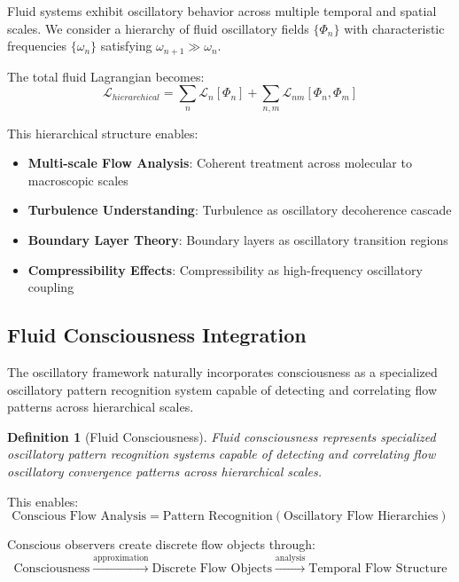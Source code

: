 \documentclass[12pt,a4paper]{article}
\newtheorem{definition}{Definition}
\begin{document}
Fluid systems exhibit oscillatory behavior across multiple temporal and spatial scales. We consider a hierarchy of fluid oscillatory fields $\{\Phi_n\}$ with characteristic frequencies $\{\omega_n\}$ satisfying $\omega_{n+1} \gg \omega_n$.

The total fluid Lagrangian becomes:
\begin{equation}
\mathcal{L}_{hierarchical} = \sum_n \mathcal{L}_n[\Phi_n] + \sum_{n,m} \mathcal{L}_{nm}[\Phi_n, \Phi_m]
\end{equation}

This hierarchical structure enables:
\begin{itemize}
\item \textbf{Multi-scale Flow Analysis}: Coherent treatment across molecular to macroscopic scales
\item \textbf{Turbulence Understanding}: Turbulence as oscillatory decoherence cascade
\item \textbf{Boundary Layer Theory}: Boundary layers as oscillatory transition regions
\item \textbf{Compressibility Effects}: Compressibility as high-frequency oscillatory coupling
\end{itemize}

\subsection{Fluid Consciousness Integration}

The oscillatory framework naturally incorporates consciousness as a specialized oscillatory pattern recognition system capable of detecting and correlating flow patterns across hierarchical scales.

\begin{definition}[Fluid Consciousness]
Fluid consciousness represents specialized oscillatory pattern recognition systems capable of detecting and correlating flow oscillatory convergence patterns across hierarchical scales.
\end{definition}

This enables:
\begin{equation}
\text{Conscious Flow Analysis} = \text{Pattern Recognition}(\text{Oscillatory Flow Hierarchies})
\end{equation}

Conscious observers create discrete flow objects through:
\begin{equation}
\text{Consciousness} \xrightarrow{\text{approximation}} \text{Discrete Flow Objects} \xrightarrow{\text{analysis}} \text{Temporal Flow Structure}
\end{equation}
\end{document}
